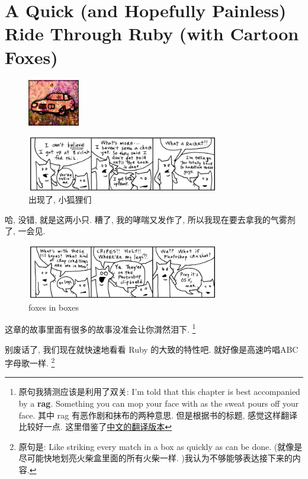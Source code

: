 \chapter{A Quick (and Hopefully Painless) Ride Through Ruby (with Cartoon Foxes)}
\begin{figure}[h]
  \centering
  \includegraphics[width=0.2\textwidth]{image/why/chapter-3.jpg}
\end{figure}

\begin{figure}[h]
  \centering
  \includegraphics[width=0.75\textwidth]{image/why/foxes-1.png}
  \caption{出现了, 小狐狸们}
\end{figure}

哈, 没错, 就是这两小只. 糟了, 我的哮喘又发作了, 
所以我现在要去拿我的气雾剂了, 一会见. 

\begin{figure}[h]
  \centering
  \includegraphics[width=0.75\textwidth]{image/why/foxes-2.png}
  \caption{foxes in boxes}
\end{figure}

这章的故事里面有很多的故事没准会让你潸然泪下. 
\footnote{原句我猜测应该是利用了双关: I'm told that this chapter is best accompanied by a \textbf{rag}. Something you can mop your face with as the sweat pours off your face. 其中 rag 有恶作剧和抹布的两种意思. 但是根据书的标题, 感觉这样翻译比较好一点. 这里借鉴了\href{http://codecly259.github.io/poignant-guide-cn/book/chapter-3.html}{中文的翻译版本}}

别废话了, 我们现在就快速地看看 Ruby 的大致的特性吧. 
就好像是高速吟唱ABC字母歌一样. 
\footnote{原句是: Like striking every match in a box as quickly as can be done. (就像是尽可能快地划亮火柴盒里面的所有火柴一样. )我认为不够能够表达接下来的内容. }

